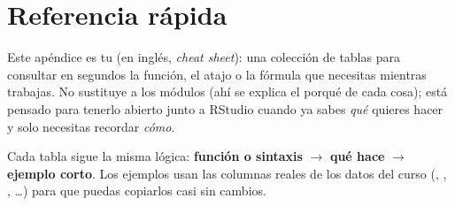 \chapter{Referencia rápida}
\label{ap:referencia}

Este apéndice es tu  (en inglés, \emph{cheat sheet}): una
colección de tablas para consultar en segundos la función, el atajo o la
fórmula que necesitas mientras trabajas. No sustituye a los módulos (ahí se
explica el porqué de cada cosa); está pensado para tenerlo abierto junto a
RStudio cuando ya sabes \emph{qué} quieres hacer y solo necesitas recordar
\emph{cómo}.

Cada tabla sigue la misma lógica: \textbf{función o sintaxis}
$\rightarrow$ \textbf{qué hace} $\rightarrow$ \textbf{ejemplo corto}. Los
ejemplos usan las columnas reales de los datos del curso
(, ,
, \ldots) para que puedas
copiarlos casi sin cambios.

